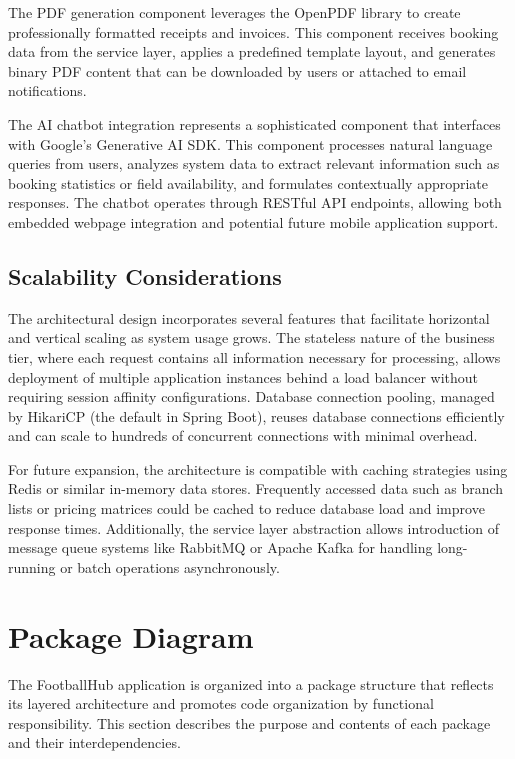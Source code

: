 The PDF generation component leverages the OpenPDF library to create professionally formatted receipts and invoices. This component receives booking data from the service layer, applies a predefined template layout, and generates binary PDF content that can be downloaded by users or attached to email notifications.

The AI chatbot integration represents a sophisticated component that interfaces with Google's Generative AI SDK. This component processes natural language queries from users, analyzes system data to extract relevant information such as booking statistics or field availability, and formulates contextually appropriate responses. The chatbot operates through RESTful API endpoints, allowing both embedded webpage integration and potential future mobile application support.

\subsection{Scalability Considerations}

The architectural design incorporates several features that facilitate horizontal and vertical scaling as system usage grows. The stateless nature of the business tier, where each request contains all information necessary for processing, allows deployment of multiple application instances behind a load balancer without requiring session affinity configurations. Database connection pooling, managed by HikariCP (the default in Spring Boot), reuses database connections efficiently and can scale to hundreds of concurrent connections with minimal overhead.

For future expansion, the architecture is compatible with caching strategies using Redis or similar in-memory data stores. Frequently accessed data such as branch lists or pricing matrices could be cached to reduce database load and improve response times. Additionally, the service layer abstraction allows introduction of message queue systems like RabbitMQ or Apache Kafka for handling long-running or batch operations asynchronously.

\section{Package Diagram}

The FootballHub application is organized into a package structure that reflects its layered architecture and promotes code organization by functional responsibility. This section describes the purpose and contents of each package and their interdependencies.

